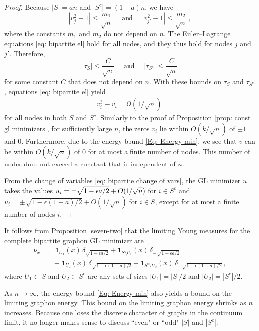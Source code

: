 \documentclass[11pt]{amsart}
\def\ep{\epsilon}
\def\ra{\rightarrow}
\numberwithin{equation}{section}
\begin{document}
{\begin{proof}
Because $|S| = an$ and $|S^c| = (1 - a)n$, we have 
\begin{equation*}
    |v_j^2 - 1| \leq \frac{m_1}{\sqrt{n}} \quad \text{ and } \quad {|v_{j'}^2 - 1|} \leq \frac{m_2}{\sqrt{n}} \,,
\end{equation*}
where the constants $m_1$ and $m_2$ do not depend on $n$. {The Euler--Lagrange} equations \eqref{eq: bipartite el} hold for all nodes, and they thus hold for nodes $j$ and $j'$. Therefore,
\begin{equation*}
    | \tau_S  | \leq \frac{C}{\sqrt{n}} \quad \text{ and }  \quad  |\tau_{S^c}| \leq \frac{C}{\sqrt{n}} 
\end{equation*}
for some constant $C$ that does not depend on $n$. With these bounds on $\tau_S$ and $\tau_{S^c}$, equations \eqref{eq: bipartite el} yield
\begin{align*}
    v_i^3 - v_i = O(1/\sqrt{n}) \,
\end{align*}
for all nodes in both $S$ and $S^c$. Similarly to the proof of Proposition \ref{prop: const gl minimizers}, for sufficiently large $n$, the zeros $v_i$ lie within $O(k/\sqrt{n})$ of $\pm 1$ and $0$. Furthermore, due to the energy bound \eqref{Eq: Energy-min}, we see that $v$ can be within $O(k/\sqrt{n})$ of $0$ for at most 
a finite number of nodes. {This number of nodes} does not exceed a constant that is independent of $n$.

From the change of variables \eqref{eq: bipartite change of vars}, the GL minimizer $u$ takes the values $u_i =  \pm \sqrt{1 - \ep a/2} \\ + O(1/\sqrt{n})$ for $i \in S^c$ and $u_i = \pm \sqrt{1 - \ep(1 - a)/2} + O(1/\sqrt{n}) $ for $i \in S$, except for at most a finite number of nodes $i$. 
\end{proof}

It follows from Proposition \ref{seven-two} that the limiting Young measures for the {complete bipartite} graphon GL minimizer are
\begin{align*}
    \nu_x &= \pmb{1}_{U_1}(x) \, \delta_{\sqrt{1 - \ep a/2}} + \pmb{1}_{S \setminus U_1}(x) \, \delta_{-\sqrt{1 - \ep a/2}}
    \\
    &\quad +  \pmb{1}_{U_2}(x) \, \delta_{\sqrt{1 - \ep(1 - a)/2}} + \pmb{1}_{S^c \setminus U_2}(x) \, \delta_{-\sqrt{1 - \ep(1 - a)/2}} \,,
\end{align*}
where $U_1 \subset S$ and $U_2 \subset S^c$ are any sets of sizes
$|U_1| = {|S|}/{2}$ and $|U_2| = {|S^c|}/{2}$.

As $n \ra \infty$, the energy bound \eqref{Eq: Energy-min} also yields a bound on the limiting graphon energy. {This bound on the limiting graphon energy shrinks as $n$ increases.} Because one loses the discrete character of graphs in the continuum limit, it no longer makes sense to discuss ``even" or ``odd" $|S|$ and $|S^c|$. 


}
\end{document}
